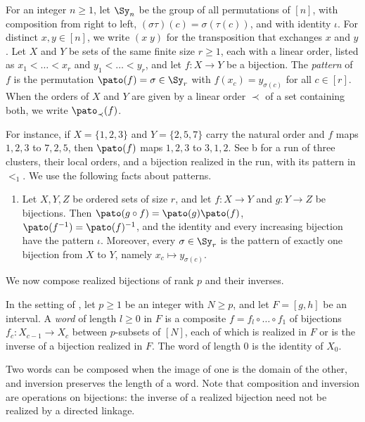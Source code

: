 \documentclass[fontsize=12pt,leading=14pt]{fullpaper}
\begin{document}
\begin{definition}\label{def:s3-patterns}
  For an integer $n\ge1$, let $\Sy_n$ be the group of all permutations of $[n]$, with composition from right to left, $(\sigma\tau)(c)=\sigma(\tau(c))$, and with identity $\iota$.
  For distinct $x,y\in[n]$, we write $(x\;y)$ for the transposition that exchanges $x$ and $y$.
  Let $X$ and $Y$ be sets of the same finite size $r\ge1$, each with a linear order, listed as $x_1<\dots<x_r$ and $y_1<\dots<y_r$, and let $f\colon X\to Y$ be a bijection.
  The \emph{pattern} of $f$ is the permutation $\pato(f)=\sigma\in\Sy_r$ with $f(x_c)=y_{\sigma(c)}$ for all $c\in[r]$.
  When the orders of $X$ and $Y$ are given by a linear order $\prec$ of a set containing both, we write $\pato_\prec(f)$.
\end{definition}

For instance, if $X=\{1,2,3\}$ and $Y=\{2,5,7\}$ carry the natural order and $f$ maps $1,2,3$ to $7,2,5$, then $\pato(f)$ maps $1,2,3$ to $3,1,2$.
See b for a run of three clusters, their local orders, and a bijection realized in the run, with its pattern in $<_1$.
We use the following facts about patterns.
\begin{enumerate}[label=\textnormal{(P\arabic*)}]
  \item\label{item:s3-P1} Let $X,Y,Z$ be ordered sets of size $r$, and let $f\colon X\to Y$ and $g\colon Y\to Z$ be bijections.
    Then $\pato(g\circ f)=\pato(g)\pato(f)$, $\pato(f^{-1})=\pato(f)^{-1}$, and the identity and every increasing bijection have the pattern $\iota$.
    Moreover, every $\sigma\in\Sy_r$ is the pattern of exactly one bijection from $X$ to $Y$, namely $x_c\mapsto y_{\sigma(c)}$.
\end{enumerate}

We now compose realized bijections of rank $p$ and their inverses.

\begin{definition}[Words]\label{def:s3-words}
  In the setting of , let $p\ge1$ be an integer with $N\ge p$, and let $F=[g,h]$ be an interval.
  A \emph{word} of length $l\ge0$ in $F$ is a composite $f=f_l\circ\dots\circ f_1$ of bijections $f_c\colon X_{c-1}\to X_c$ between $p$-subsets of $[N]$, each of which is realized in $F$ or is the inverse of a bijection realized in $F$.
  The word of length $0$ is the identity of $X_0$.
\end{definition}

Two words can be composed when the image of one is the domain of the other, and inversion preserves the length of a word.
Note that composition and inversion are operations on bijections: the inverse of a realized bijection need not be realized by a directed linkage.
\end{document}
